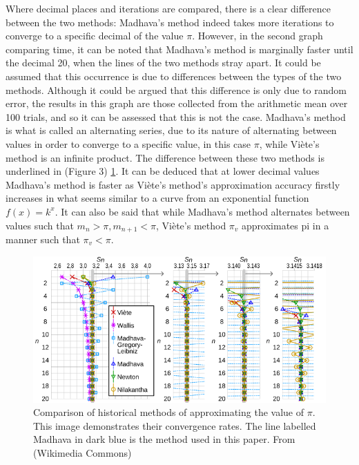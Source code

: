 Where decimal places and iterations are compared, there is a clear difference between the two methods: Madhava's method indeed takes more iterations to converge to a specific decimal of the value $\pi$. However, in the second graph comparing time, it can be noted that Madhava's method is marginally faster until the decimal 20, when the lines of the two methods stray apart. It could be assumed that this occurrence is due to differences between the types of the two methods. Although it could be argued that this difference is only due to random error, the results in this graph are those collected from the arithmetic mean over 100 trials, and so it can be assessed that this is not the case. Madhava's method is what is called an alternating series, due to its nature of alternating between values in order to converge to a specific value, in this case $\pi$, while Viète's method is an infinite product. The difference between these two methods is underlined in (Figure 3) \ref{fig:comparaison}. It can be deduced that at lower decimal values Madhava's method is faster as Viète's method's approximation accuracy firstly increases in what seems similar to a curve from an exponential function $f(x) = k^x$. It can also be said that while Madhava's method alternates between values such that $m_{n} > \pi, m_{n+1} < \pi$, Viète's method $\pi_v$ approximates pi in a manner such that $\pi_v < \pi$.

\begin{figure}[h]
    \includegraphics[width=\linewidth]{image.png}
    \caption{Comparison of historical methods of approximating the value of $\pi$. This image demonstrates
        their convergence rates. The line labelled Madhava in dark blue is the method used in this paper.
        From (Wikimedia Commons) \cite{infinite_series_comparaison}}
    \label{fig:comparaison}
\end{figure}
